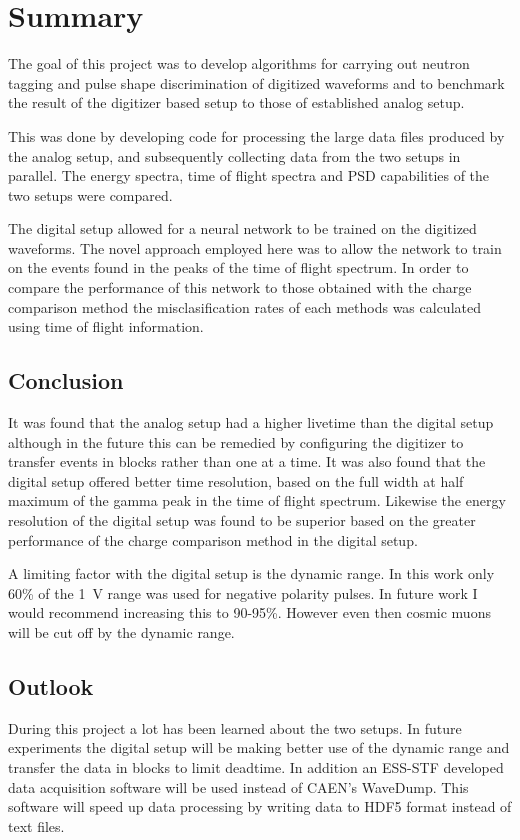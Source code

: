 \documentclass[main.tex]{subfiles}
\begin{document}
\chapter{Summary}
The goal of this project was to develop algorithms for carrying out neutron tagging and pulse shape discrimination of digitized waveforms and to benchmark the result of the digitizer based setup to those of established analog setup.

This was done by developing code for processing the large data files produced by the analog setup, and subsequently collecting data from the two setups in parallel. The energy spectra, time of flight spectra and PSD capabilities of the two setups were compared.

The digital setup allowed for a neural network to be trained on the digitized waveforms. The novel approach employed here was to allow the network to train on the events found in the peaks of the time of flight spectrum. In order to compare the performance of this network to those obtained with the charge comparison method the misclasification rates of each methods was calculated using time of flight information.



\section{Conclusion}
It was found that the analog setup had a higher livetime than the digital setup although in the future this can be remedied by configuring the digitizer to transfer events in blocks rather than one at a time. It was also found that the digital setup offered better time resolution, based on the full width at half maximum of the gamma peak in the time of flight spectrum. Likewise the energy resolution of the digital setup was found to be superior based on the greater performance of the charge comparison method in the digital setup. 

A limiting factor with the digital setup is the dynamic range. In this work only 60\% of the \SI{1}{V} range was used for negative polarity pulses. In future work I would recommend increasing this to 90-95\%. However even then cosmic muons will be cut off by the dynamic range. 

\section{Outlook}
During this project a lot has been learned about the two setups. In future experiments the digital setup will be making better use of the dynamic range and transfer the data in blocks to limit deadtime. In addition an ESS-STF developed data acquisition software will be used instead of CAEN's WaveDump. This software will speed up data processing by writing data to HDF5 format instead of text files. 
\end{document}
